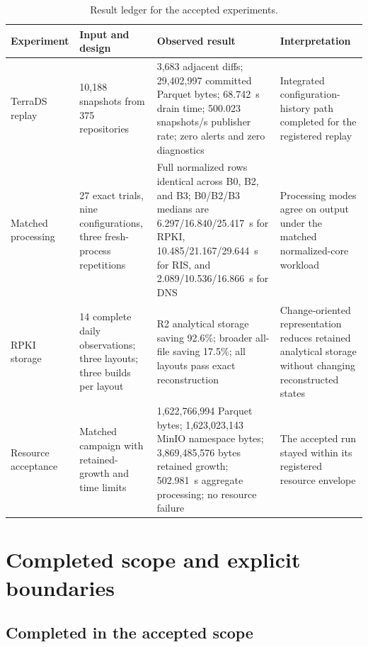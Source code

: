 \documentclass[a4paper,11pt]{article}
\begin{document}
\begin{table}[ht]
\centering
\caption{Result ledger for the accepted experiments.}
\label{tab:result-ledger}
\scriptsize
\begin{tabularx}{\textwidth}{@{}p{}p{}p{}X@{}}
\toprule
Experiment & Input and design & Observed result & Interpretation \\
\midrule
TerraDS replay & 10,188 snapshots from 375 repositories & 3,683 adjacent diffs; 29,402,997 committed Parquet bytes; 68.742~s drain time; 500.023 snapshots/s publisher rate; zero alerts and zero diagnostics & Integrated configuration-history path completed for the registered replay \\
Matched processing & 27 exact trials, nine configurations, three fresh-process repetitions & Full normalized rows identical across B0, B2, and B3; B0/B2/B3 medians are 6.297/16.840/25.417~s for RPKI, 10.485/21.167/29.644~s for RIS, and 2.089/10.536/16.866~s for DNS & Processing modes agree on output under the matched normalized-core workload \\
RPKI storage & 14 complete daily observations; three layouts; three builds per layout & R2 analytical storage saving 92.6\%; broader all-file saving 17.5\%; all layouts pass exact reconstruction & Change-oriented representation reduces retained analytical storage without changing reconstructed states \\
Resource acceptance & Matched campaign with retained-growth and time limits & 1,622,766,994 Parquet bytes; 1,623,023,143 MinIO namespace bytes; 3,869,485,576 bytes retained growth; 502.981~s aggregate processing; no resource failure & The accepted run stayed within its registered resource envelope \\
\bottomrule
\end{tabularx}
\end{table}

\section{Completed scope and explicit boundaries}

\subsection{Completed in the accepted scope}
\end{document}
